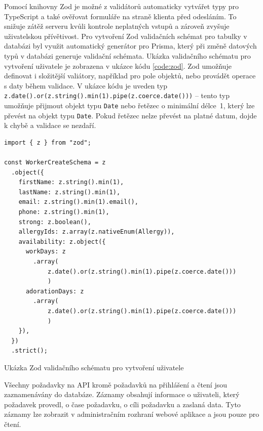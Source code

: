 Pomocí knihovny Zod je možné z validátorů automaticky vytvářet typy pro TypeScript a také ověřovat formuláře na straně klienta před odesláním.
To snižuje zátěž serveru kvůli kontrole neplatných vstupů a zároveň zvyšuje uživatelskou přívětivost.
Pro vytvoření Zod validačních schémat pro tabulky v databázi byl využit automatický generátor pro Prisma, který při změně datových typů v databázi
generuje validační schémata. Ukázka validačního schématu pro vytvoření uživatele je zobrazena v ukázce kódu \ref{code:zod}.
Zod umožňuje definovat i složitější valiátory, například pro pole objektů, nebo provádět operace s daty během validace.
V ukázce kódu je uveden typ \texttt{z.date().or(z.string().min(1).pipe(z.coerce.date()))} -- tento typ umožňuje přijmout objekt typu \texttt{Date} nebo řetězec o minimální
délce~1, který lze převést na objekt typu \texttt{Date}. Pokud řetězec nelze převést na platné datum, dojde k chybě a validace se nezdaří.

\begin{listing}[h]
    \begin{verbatim}
import { z } from "zod";

const WorkerCreateSchema = z
  .object({
    firstName: z.string().min(1),
    lastName: z.string().min(1),
    email: z.string().min(1).email(),
    phone: z.string().min(1),
    strong: z.boolean(),
    allergyIds: z.array(z.nativeEnum(Allergy)),
    availability: z.object({
      workDays: z
        .array(
            z.date().or(z.string().min(1).pipe(z.coerce.date()))
            )
      adorationDays: z
        .array(
            z.date().or(z.string().min(1).pipe(z.coerce.date()))
            )
    }),
  })
  .strict();
    \end{verbatim}
    \caption{Ukázka Zod validačního schématu pro vytvoření uživatele}
    \label{code:zod}
\end{listing}

Všechny požadavky na API kromě požadavků na přihlášení a čtení jsou zaznamenávány do databáze. Záznamy obsahují informace o uživateli, který požadavek
provedl, o čase požadavku, o cíli požadavku a zaslaná data. Tyto záznamy lze zobrazit v administračním rozhraní webové aplikace a jsou pouze pro čtení.